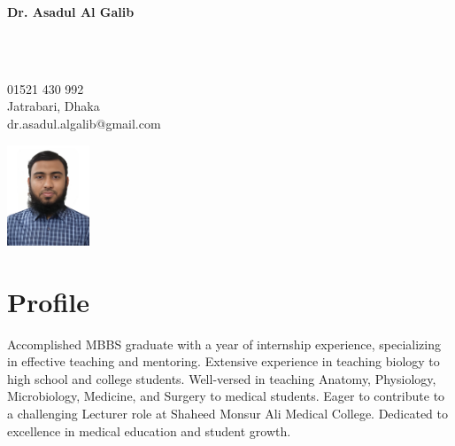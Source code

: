 \documentclass[a4paper,12pt]{article}
\begin{document}
\vspace{-2pt}
\begin{minipage}[t][3cm]{1.2\textwidth}
    \raggedright
  \begin{minipage}[h][3cm]{0.4\textwidth}
    {\Huge\bfseries\color{black}Dr. Asadul Al Galib}
  \end{minipage}
  \begin{minipage}[h][2.6cm][b]{0.03\textwidth}
      \faPhone\\
      \faMapMarker\\
      \faEnvelopeO
  \end{minipage}
  \begin{minipage}[h][2.6cm][b]{0.28\textwidth}
      01521 430 992\\
      Jatrabari, Dhaka\\
      dr.asadul.algalib@gmail.com
  \end{minipage}
  \begin{minipage}[h][1.4cm][m]{0.1\textwidth}
    \centering
    \includegraphics[height=3cm]{galib-passport-size}
  \end{minipage}
\end{minipage}
  
\begin{minipage}[t][5.2cm]{0.98\textwidth}
  \section*{Profile}
  Accomplished MBBS graduate with a year of internship experience, specializing in effective teaching and mentoring. 
  Extensive experience in teaching biology to high school and college students. 
  Well-versed in teaching Anatomy, Physiology, Microbiology, Medicine, and Surgery to medical students. 
  Eager to contribute to a challenging Lecturer role at Shaheed Monsur Ali Medical College. 
  Dedicated to excellence in medical education and student growth.
\end{minipage}
\end{document}
